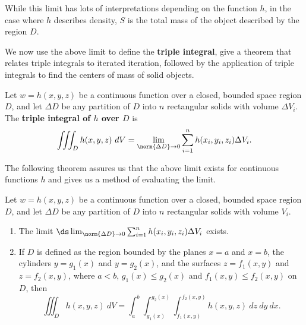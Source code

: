 While this limit has lots of interpretations depending on the function $h$, in the case where $h$ describes density, $S$ is the total mass of the object described by the region $D$.

We now use the above limit to define the \textbf{triple integral}, give a theorem that relates triple integrals to iterated iteration, followed by the application of triple integrals to find the centers of mass of solid objects.

{Let $w=h(x,y,z)$ be a continuous function over a closed, bounded space region $D$, and let $\Delta D$ be any partition of $D$ into $n$ rectangular solids with volume $\Delta V_i$. The \textbf{triple integral of $h$ over $D$} is
$$\iiint_Dh(x,y,z)\ dV = \lim_{\norm{\Delta D}\to 0}\sum_{i=1}^n h(x_i,y_i,z_i)\Delta V_i.$$
\mbox{}}

The following theorem assures us that the above limit exists for continuous functions $h$ and gives us a method of evaluating the limit.

{Let $w=h(x,y,z)$ be a continuous function over a closed, bounded space region $D$, and let $\Delta D$ be any partition of $D$ into $n$ rectangular solids with volume $V_i$.

\begin{enumerate}
\item		The limit $\ds \lim_{\norm{\Delta D}\to 0}\sum_{i=1}^n h(x_i,y_i,z_i)\Delta V_i$ exists.

\item		If $D$ is defined as the region bounded by the planes $x=a$ and $x=b$, the cylinders $y=g_1(x)$ and $y=g_2(x)$, and the surfaces $z=f_1(x,y)$ and $z=f_2(x,y)$, where $a<b$, $g_1(x)\leq g_2(x)$ and $f_1(x,y)\leq f_2(x,y)$ on $D$, then
	$$\iiint_D h(x,y,z)\ dV = \int_a^b\int_{g_1(x)}^{g_2(x)}\int_{f_1(x,y)}^{f_2(x,y)} h(x,y,z)\ dz\ dy\ dx.$$

\end{enumerate}}

